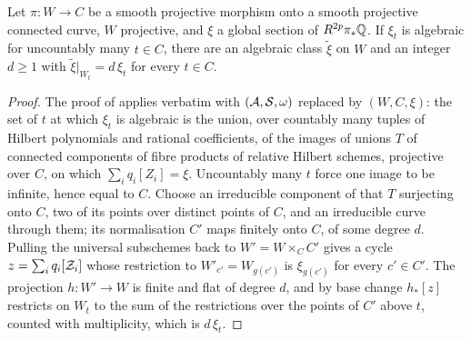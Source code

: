 \begin{lemma}\label{lem:spreading}
Let $\pi\colon W\to C$ be a smooth projective morphism onto a smooth projective
connected curve, $W$ projective, and $\xi$ a global section of
$R^{2p}\pi_{*}\mathbb{Q}$. If $\xi_{t}$ is algebraic for uncountably many $t\in C$,
there are an algebraic class $\tilde\xi$ on $W$ and an integer $d\ge1$ with
$\tilde\xi|_{W_{t}}=d\,\xi_{t}$ for every $t\in C$.
\end{lemma}

\begin{proof}
The proof of  applies verbatim with $(\mathcal{A},\mathcal{S},\omega)$
replaced by $(W,C,\xi)$: the set of $t$ at which $\xi_{t}$ is algebraic is
the union, over countably many tuples of Hilbert polynomials and rational
coefficients, of the images of unions $T$ of connected components of fibre
products of relative Hilbert schemes, projective over $C$, on which
$\sum_{i}q_{i}[Z_{i}]=\xi$. Uncountably many $t$ force one image to be
infinite, hence equal to $C$. Choose an irreducible component of that $T$
surjecting onto $C$, two of its points over distinct points of $C$, and an
irreducible curve through them; its normalisation $C'$ maps finitely onto $C$,
of some degree $d$. Pulling the universal subschemes back to
$W'=W\times_{C}C'$ gives a cycle $z=\sum_{i}q_{i}[\mathcal{Z}_{i}]$ whose restriction
to $W'_{c'}=W_{g(c')}$ is $\xi_{g(c')}$ for every $c'\in C'$. The projection
$h\colon W'\to W$ is finite and flat of degree $d$, and by base change
$h_{*}[z]$ restricts on $W_{t}$ to the sum of the restrictions over the
points of $C'$ above $t$, counted with multiplicity, which is $d\,\xi_{t}$.
\end{proof}

